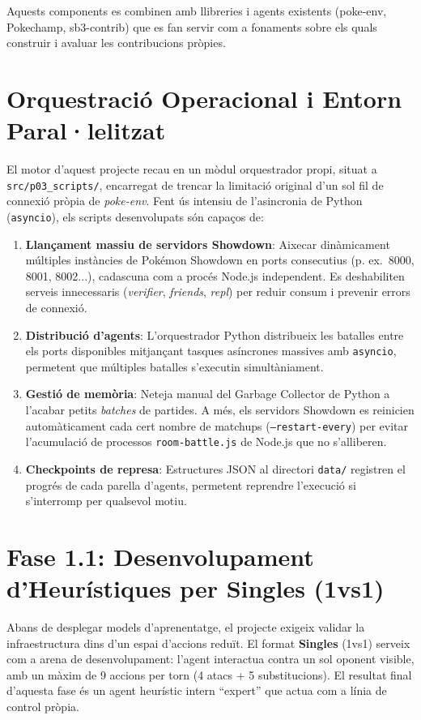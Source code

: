 Aquests components es combinen amb llibreries i agents existents (poke-env, Pokechamp, sb3-contrib) que es fan servir com a fonaments sobre els quals construir i avaluar les contribucions pròpies.

\section{Orquestració Operacional i Entorn Paral·lelitzat}

El motor d'aquest projecte recau en un mòdul orquestrador propi, situat a \texttt{src/p03\_scripts/}, encarregat de trencar la limitació original d'un sol fil de connexió pròpia de \textit{poke-env}. Fent ús intensiu de l'asincronia de Python (\texttt{asyncio}), els scripts desenvolupats són capaços de:

\begin{enumerate}
    \item \textbf{Llançament massiu de servidors Showdown}: Aixecar dinàmicament múltiples instàncies de Pokémon Showdown en ports consecutius (p. ex.\ 8000, 8001, 8002...), cadascuna com a procés Node.js independent. Es deshabiliten serveis innecessaris (\textit{verifier}, \textit{friends}, \textit{repl}) per reduir consum i prevenir errors de connexió.
    \item \textbf{Distribució d'agents}: L'orquestrador Python distribueix les batalles entre els ports disponibles mitjançant tasques asíncrones massives amb \texttt{asyncio}, permetent que múltiples batalles s'executin simultàniament.
    \item \textbf{Gestió de memòria}: Neteja manual del Garbage Collector de Python a l'acabar petits \textit{batches} de partides. A més, els servidors Showdown es reinicien automàticament cada cert nombre de matchups (\texttt{--restart-every}) per evitar l'acumulació de processos \texttt{room-battle.js} de Node.js que no s'alliberen.
    \item \textbf{Checkpoints de represa}: Estructures JSON al directori \texttt{data/} registren el progrés de cada parella d'agents, permetent reprendre l'execució si s'interromp per qualsevol motiu.
\end{enumerate}


\section{Fase 1.1: Desenvolupament d'Heurístiques per Singles (1vs1)}

Abans de desplegar models d'aprenentatge, el projecte exigeix validar la infraestructura dins d'un espai d'accions reduït. El format \textbf{Singles} (1vs1) serveix com a arena de desenvolupament: l'agent interactua contra un sol oponent visible, amb un màxim de 9 accions per torn (4 atacs + 5 substitucions). El resultat final d'aquesta fase és un agent heurístic intern ``expert'' que actua com a línia de control pròpia.

